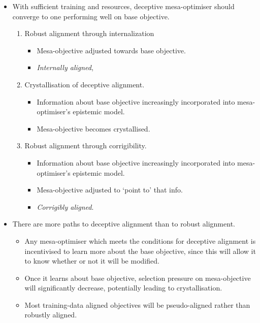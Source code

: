 \begin{itemize}
    \item With sufficient training and resources, deceptive mesa-optimiser should converge to one performing well on base objective.
    \begin{enumerate}[label=\arabic*.]
        \item Robust alignment through internalization
        \begin{itemize}
            \item Mesa-objective adjusted towards base objective.
            \item \emph{Internally aligned},
        \end{itemize}
        \item Crystallisation of deceptive alignment.
        \begin{itemize}
            \item Information about base objective increasingly incorporated into mesa-optimiser's epistemic model.
            \item Mesa-objective becomes crystallised.
        \end{itemize}
        \item Robust alignment through corrigibility.
        \begin{itemize}
            \item Information about base objective increasingly incorporated into mesa-optimiser's epistemic model.
            \item Mesa-objective adjusted to `point to' that info.
            \item \emph{Corrigibly aligned}.
        \end{itemize}
    \end{enumerate}
    \item There are more paths to deceptive alignment than to robust alignment.
    \begin{itemize}
        \item Any mesa-optimiser which meets the conditions for deceptive alignment is incentivised to learn more about the base objective, since this will allow it to know whether or not it will be modified.
        \item Once it learns about base objective, selection pressure on mesa-objective will significantly decrease, potentially leading to crystallisation.
        \item Most training-data aligned objectives will be pseudo-aligned rather than robustly aligned.
    \end{itemize}

\end{itemize}
